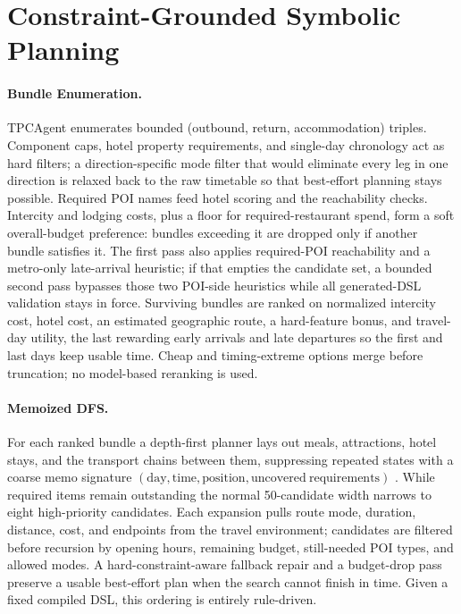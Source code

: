 \documentclass{article}
\begin{document}
\section{Constraint-Grounded Symbolic Planning}
 
\paragraph{Bundle Enumeration.}
TPCAgent enumerates bounded (outbound, return, accommodation) triples.
Component caps, hotel property requirements, and single-day chronology act
as hard filters; a direction-specific mode filter that would eliminate
every leg in one direction is relaxed back to the raw timetable so that
best-effort planning stays possible. Required POI names feed hotel scoring
and the reachability checks.
Intercity and lodging costs, plus a floor for required-restaurant spend,
form a soft overall-budget preference: bundles exceeding it are dropped
only if another bundle satisfies it. The first pass also applies
required-POI reachability and a metro-only late-arrival heuristic; if that
empties the candidate set, a bounded second pass bypasses those two
POI-side heuristics while all generated-DSL validation stays in force.
Surviving bundles are ranked on normalized intercity cost, hotel cost, an
estimated geographic route, a hard-feature bonus, and travel-day utility,
the last rewarding early arrivals and late departures so the first and last
days keep usable time. Cheap and timing-extreme options merge before
truncation; no model-based reranking is used.
 
\paragraph{Memoized DFS.}
For each ranked bundle a depth-first planner lays out meals, attractions,
hotel stays, and the transport chains between them, suppressing repeated
states with a coarse memo signature
$(\mathrm{day},\mathrm{time},\mathrm{position},\mathrm{uncovered\ requirements})$
. While required items remain outstanding the normal 50-candidate width
narrows to eight high-priority candidates. Each expansion pulls route mode, duration, distance, cost, and endpoints
from the travel environment; candidates are filtered before recursion by
opening hours, remaining budget, still-needed POI types, and allowed modes.
A hard-constraint-aware fallback repair and a budget-drop pass preserve a
usable best-effort plan when the search cannot finish in time. Given a
fixed compiled DSL, this ordering is entirely rule-driven.
 
\end{document}
